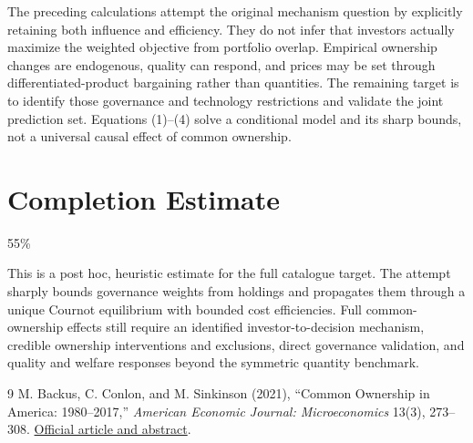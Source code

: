 \documentclass[11pt]{article}
\theoremstyle{definition}
\begin{document}
The preceding calculations attempt the original mechanism question by explicitly retaining both influence and efficiency. They do not infer that investors actually maximize the weighted objective from portfolio overlap. Empirical ownership changes are endogenous, quality can respond, and prices may be set through differentiated-product bargaining rather than quantities. The remaining target is to identify those governance and technology restrictions and validate the joint prediction set. Equations (1)--(4) solve a conditional model and its sharp bounds, not a universal causal effect of common ownership.

\section{Completion Estimate}
55\%

This is a post hoc, heuristic estimate for the full catalogue target.
The attempt sharply bounds governance weights from holdings and propagates them through a unique Cournot equilibrium with bounded cost efficiencies. Full common-ownership effects still require an identified investor-to-decision mechanism, credible ownership interventions and exclusions, direct governance validation, and quality and welfare responses beyond the symmetric quantity benchmark.

\begin{thebibliography}{9}
 M. Backus, C. Conlon, and M. Sinkinson (2021), ``Common Ownership in America: 1980--2017,'' \emph{American Economic Journal: Microeconomics} 13(3), 273--308. \href{https://www.aeaweb.org/articles?id=10.1257/mic.20190389}{Official article and abstract}.
\end{thebibliography}
\end{document}
